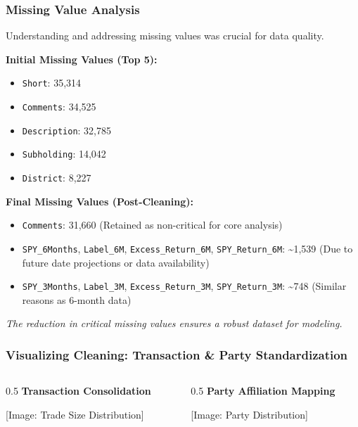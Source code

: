 \documentclass[aspectratio=169]{beamer}
\begin{document}
\begin{frame}
    \frametitle{Missing Value Analysis}
    Understanding and addressing missing values was crucial for data quality.

    \textbf{Initial Missing Values (Top 5):}
    \begin{itemize}
        \item \texttt{Short}: 35,314
        \item \texttt{Comments}: 34,525
        \item \texttt{Description}: 32,785
        \item \texttt{Subholding}: 14,042
        \item \texttt{District}: 8,227
    \end{itemize}
    \vspace{1em}
    \textbf{Final Missing Values (Post-Cleaning):}
    \begin{itemize}
        \item \texttt{Comments}: 31,660 (Retained as non-critical for core analysis)
        \item \texttt{SPY\_6Months}, \texttt{Label\_6M}, \texttt{Excess\_Return\_6M}, \texttt{SPY\_Return\_6M}: \textasciitilde1,539 (Due to future date projections or data availability)
        \item \texttt{SPY\_3Months}, \texttt{Label\_3M}, \texttt{Excess\_Return\_3M}, \texttt{SPY\_Return\_3M}: \textasciitilde748 (Similar reasons as 6-month data)
    \end{itemize}
    \vspace{1em}
    \textit{The reduction in critical missing values ensures a robust dataset for modeling.}
\end{frame}

\begin{frame}
    \frametitle{Visualizing Cleaning: Transaction \& Party Standardization}
    \begin{columns}
        \begin{column}{0.5\textwidth}
            \textbf{Transaction Consolidation}

            [Image: Trade Size Distribution]
        \end{column}
        \begin{column}{0.5\textwidth}
            \textbf{Party Affiliation Mapping}

            [Image: Party Distribution]
        \end{column}
    \end{columns}
\end{frame}
\end{document}
